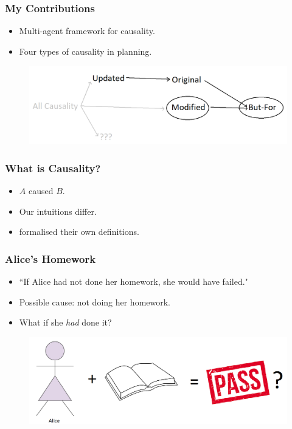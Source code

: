 \documentclass{beamer}
\theoremstyle{plain}
\theoremstyle{definition}
\begin{document}
\begin{frame}
\frametitle{My Contributions}
\begin{itemize}
\item Multi-agent framework for causality.
\item Four types of causality in planning.
\end{itemize}

\begin{figure}
\includegraphics[scale=0.35]{causaldiagram}
\end{figure}
\end{frame}


 
\begin{frame}
\frametitle{What is Causality?}
\begin{itemize}
\item $A$ caused $B$.
\item Our intuitions differ.
\item \citet{halpern2005causes} formalised their own definitions.

\end{itemize}

\end{frame}

\begin{frame}
\frametitle{Alice's Homework}
\begin{itemize}
\item ``If Alice had not done her homework, she would have failed."
\item Possible cause: not doing her homework.
\item What if she \textit{had} done it?
\end{itemize}

\begin{figure}
\includegraphics[scale=0.31]{alicepass}
\end{figure}

\end{frame}
\end{document}
